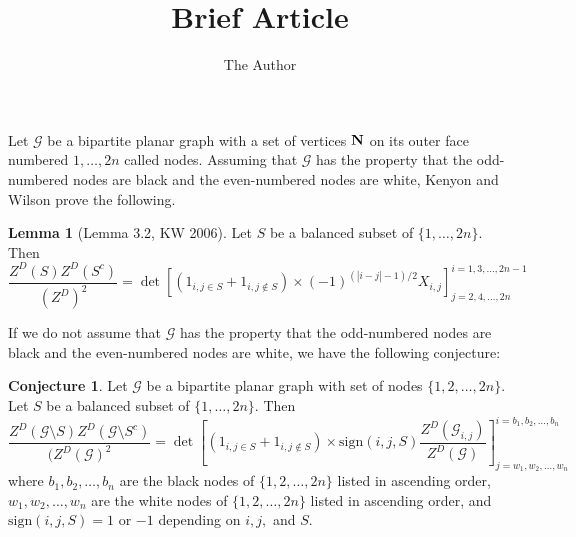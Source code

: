 \documentclass[11pt]{amsart}
\title{Brief Article}
\author{The Author}
\theoremstyle{definition}
\newtheorem*{conj*}{Conjecture}
\newtheorem*{lemma*}{Lemma}
\begin{document}

Let $\mathcal{G}$ be a bipartite planar graph with a set of vertices ${\bf N}$ on its outer face numbered $1, \ldots, 2n$ called nodes. Assuming that $\mathcal{G}$ has the property that the odd-numbered nodes are black and the even-numbered nodes are white, Kenyon and Wilson prove the following. 

\begin{lemma*}[Lemma 3.2, KW 2006]
Let $S$ be a balanced subset of $\{1, \ldots, 2n\}$. Then
$$\dfrac{Z^{D}(S) Z^{D}(S^{c})}{(Z^{D})^{2}} = 
\det[(1_{i, j \in S} + 1_{i, j \notin S}) \times (-1)^{(|i - j| -1)/2} X_{i, j} ]^{i = 1, 3, \ldots, 2n-1}_{j = 2, 4, \ldots, 2n}$$
\end{lemma*}

If we do not assume that $\mathcal{G}$ has the property that the odd-numbered nodes are black and the even-numbered nodes are white, we have the following conjecture:

\begin{conj*}
Let $\mathcal{G}$ be a bipartite planar graph with set of nodes $\{1, 2, \ldots, 2n\}$. Let $S$ be a balanced subset of $\{1, \ldots, 2n\}$. Then 
$$\dfrac{Z^{D}(\mathcal{G} \setminus S) Z^{D}(\mathcal{G} \setminus S^{c})}{(Z^{D}(\mathcal{G})^{2}} = 
\det \left[(1_{i, j \in S} + 1_{i, j \notin S}) \times \text{sign}(i, j, S) \dfrac{Z^{D}(\mathcal{G}_{i, j})}{Z^{D}(\mathcal{G})} \right]^{i = b_1, b_2, \ldots, b_n}_{j = w_1, w_2, \ldots, w_n}$$
where $b_1, b_2, \ldots, b_n$ are the black nodes of $\{1, 2, \ldots, 2n\}$ listed in ascending order,$w_1, w_2, \ldots, w_n$ are the white nodes of $\{1, 2, \ldots, 2n\}$ listed in ascending order, and $\text{sign}(i, j, S) = 1$ or $-1$ depending on $i, j,$ and $S$. 
\end{conj*}
\end{document}
